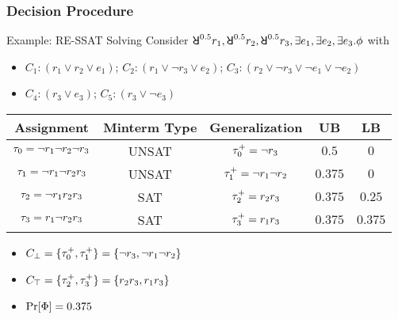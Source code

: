 \begin{frame}
  \frametitle{Decision Procedure}
  \begin{block}{Example: RE-SSAT Solving}
    Consider $\random{0.5}r_1,\random{0.5}r_2,\random{0.5}r_3,\exists e_1,\exists e_2,\exists e_3.\pf$ with
    \begin{itemize}
      \item[] $C_1: (r_1 \lor r_2 \lor e_1)$; $C_2: (r_1 \lor \lnot r_3 \lor e_2)$; $C_3: (r_2 \lor \lnot r_3 \lor \lnot e_1 \lor \lnot e_2)$
      \item[] $C_4: (r_3 \lor e_3)$; $C_5: (r_3 \lor \lnot e_3)$
    \end{itemize}
    \pause
    \begin{table}[t]
      \centering
      \small
      \begin{tabular}{c|c|c|c|c}
        Assignment                            & Minterm Type & Generalization                & UB      & LB      \\
        \hline
        $\tau_0=\lnot r_1 \lnot r_2 \lnot r_3$ & UNSAT        & $\tau_0^+=\lnot r_3$           & $0.5$   & $0$     \\
        \pause
        $\tau_1=\lnot r_1 \lnot r_2 r_3$       & UNSAT        & $\tau_1^+=\lnot r_1 \lnot r_2$ & $0.375$ & $0$     \\
        \pause
        $\tau_2=\lnot r_1 r_2 r_3$             & SAT          & $\tau_2^+=r_2r_3$              & $0.375$ & $0.25$  \\
        \pause
        $\tau_3=r_1 \lnot r_2 r_3$             & SAT          & $\tau_3^+=r_1r_3$              & $0.375$ & $0.375$
      \end{tabular}
    \end{table}
    \pause
    \begin{itemize}
      \item $C_\bot=\{\tau_0^+,\tau_1^+\}=\{\lnot r_3,\lnot r_1 \lnot r_2\}$
            \pause
      \item $C_\top=\{\tau_2^+,\tau_3^+\}=\{r_2r_3,r_1r_3\}$
            \pause
      \item $\Pr[\Phi]=0.375$
    \end{itemize}
  \end{block}
\end{frame}

